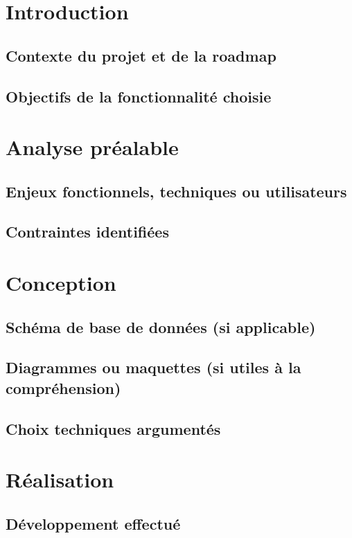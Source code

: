 \documentclass[a4paper,12pt]{report}
\begin{document}
\newpage
\renewcommand{\contentsname}{Sommaire}
\tableofcontents
\newpage

\section{Introduction}
  \subsection{Contexte du projet et de la roadmap}
  \subsection{Objectifs de la fonctionnalité choisie}

\section{Analyse préalable}
  \subsection{Enjeux fonctionnels, techniques ou utilisateurs}
  \subsection{Contraintes identifiées}

\section{Conception}
  \subsection{Schéma de base de données (si applicable)}
  \subsection{Diagrammes ou maquettes (si utiles à la compréhension)}
  \subsection{Choix techniques argumentés}

\section{Réalisation}
  \subsection{Développement effectué}
\end{document}
